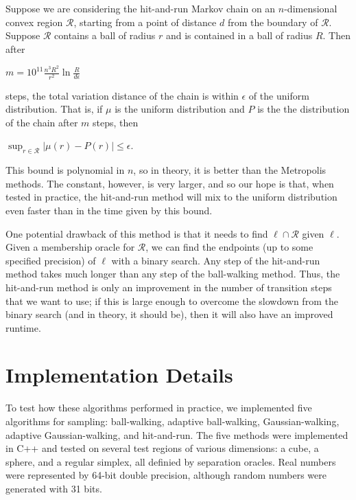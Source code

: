 \documentclass[11pt]{article}
\begin{document}
\begin{theorem} Suppose we are considering the hit-and-run Markov chain on an $n$-dimensional convex region $\mathcal{R}$, starting from a point of distance $d$ from the boundary of $\mathcal{R}$. Suppose $\mathcal{R}$ contains a ball of radius $r$ and is contained in a ball of radius $R$. Then after
\begin{center}$m = \displaystyle 10^{11}\frac{n^3 R^2}{r^2}\ln\frac{R}{d\epsilon}$\end{center}
steps, the total variation distance of the chain is within $\epsilon$ of the uniform distribution. That is, if $\mu$ is the uniform distribution and $P$ is the the distribution of the chain after $m$ steps, then
\begin{center}$\displaystyle \sup_{r \in \mathcal{R}} |\mu(r) - P(r)| \le \epsilon$.\end{center}
\end{theorem}

This bound is polynomial in $n$, so in theory, it is better than the Metropolis methods. The constant, however, is very larger, and so our hope is that, when tested in practice, the hit-and-run method will mix to the uniform distribution even faster than in the time given by this bound.

One potential drawback of this method is that it needs to find $\ell \cap \mathcal{R}$ given $\ell$. Given a membership oracle for $\mathcal{R}$, we can find the endpoints (up to some specified precision) of $\ell$ with a binary search. Any step of the hit-and-run method takes much longer than any step of the ball-walking method. Thus, the hit-and-run method is only an improvement in the number of transition steps that we want to use; if this is large enough to overcome the slowdown from the binary search (and in theory, it should be), then it will also have an improved runtime.

\section{Implementation Details}

To test how these algorithms performed in practice, we implemented five algorithms for sampling: ball-walking, adaptive ball-walking, Gaussian-walking, adaptive Gaussian-walking, and hit-and-run. The five methods were implemented in C++ and tested on several test regions of various dimensions: a cube, a sphere, and a regular simplex, all definied by separation oracles. Real numbers were represented by 64-bit double precision, although random numbers were generated with 31 bits.
\end{document}
